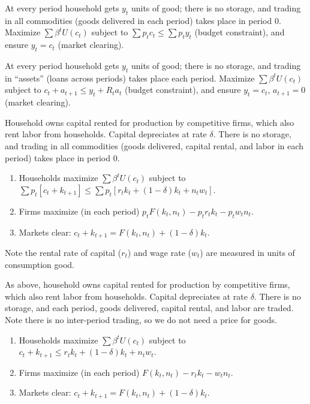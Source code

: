 \documentclass[8pt,letterpaper, landscape]{extarticle} %
\begin{document}
\begin{multicols}{3}
\begin{description}
 At every period household gets $ y_t $ units of good; there is no storage, and trading in all commodities (goods delivered in each period) takes place in period $ 0 $. Maximize $ \sum \beta^t U(c_t) $ subject to $ \sum p_t c_t \leq \sum p_t y_t $ (budget constraint), and ensure $ y_t = c_t $ (market clearing).

 At every period household gets $ y_t $ units of good; there is no storage, and trading in ``assets'' (loans across periods) takes place each period. Maximize $ \sum \beta^t U(c_t) $ subject to $ c_t + a_{t+1} \leq y_t + R_t a_t $ (budget constraint), and ensure $ y_t = c_t $, $ a_{t+1} = 0 $ (market clearing).

 Household owns capital rented for production by competitive firms, which also rent labor from households. Capital depreciates at rate $ \delta $. There is no storage, and trading in all commodities (goods delivered, capital rental, and labor in each period) takes place in period $ 0 $.
\begin{enumerate}
\item Households maximize $ \sum \beta^t U(c_t) $ subject to $ \sum p_t [c_t + k_{t+1}] \leq \sum p_t [r_t k_t + (1-\delta) k_t + n_t w_t] $.
\item Firms maximize (in each period) $ p_t F(k_t, n_t) - p_t r_t k_t - p_t w_t n_t $.
\item Markets clear: $ c_t + k_{t+1} = F(k_t, n_t) + (1-\delta) k_t $.
\end{enumerate}
Note the rental rate of capital ($ r_t $) and wage rate ($ w_t $) are measured in units of consumption good.

 As above, household owns capital rented for production by competitive firms, which also rent labor from households. Capital depreciates at rate $ \delta $. There is no storage, and each period, goods delivered, capital rental, and labor are traded. Note there is no inter-period trading, so we do not need a price for goods.
\begin{enumerate}
\item Households maximize $ \sum \beta^t U(c_t) $ subject to $ c_t + k_{t+1} \leq r_t k_t + (1-\delta) k_t + n_t w_t $.
\item Firms maximize (in each period) $ F(k_t, n_t) - r_t k_t - w_t n_t $.
\item Markets clear: $ c_t + k_{t+1} = F(k_t, n_t) + (1-\delta) k_t $.
\end{enumerate}


\end{description}
\end{multicols}
\end{document}
